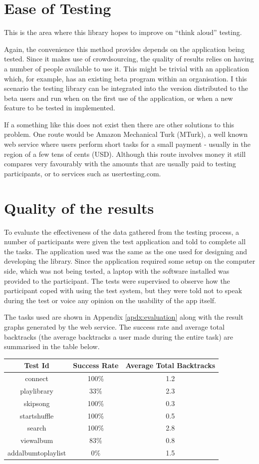 \section{Ease of Testing}

This is the area where this library hopes to improve on ``think
aloud'' testing.

Again, the convenience this method provides depends on the application
being tested. Since it makes use of crowdsourcing, the quality of
results relies on having a number of people available to use it.
This might be trivial with an application which, for example, has
an existing beta program within an organisation. I this scenario
the testing library can be integrated into the version distributed
to the beta users and run when on the first use of the application,
or when a new feature to be tested in implemented.

If a something like this does not exist then there are other solutions
to this problem. One route would be Amazon Mechanical Turk (MTurk),
a well known web service where users perform short tasks for a small
payment - usually in the region of a few tens of cents (USD).
Although this route involves money it still compares very favourably
with the amounts that are usually paid to testing participants, or
to services such as usertesting.com.

\section{Quality of the results}

To evaluate the effectiveness of the data gathered from the testing
process, a number of participants were given the test application
and told to complete all the tasks. The application used was the
same as the one used for designing and developing the library.
Since the application required some setup on the computer side,
which was not being tested, a laptop with the software installed
was provided to the participant. The tests were supervised to observe
how the participant coped with using the test system, but they were told
not to speak during the test or voice any opinion on the usability
of the app itself.

The tasks used are shown in Appendix \ref{apdx:evaluation} along
with the result graphs generated by the web service. The success
rate and average total backtracks (the average backtracks a user
made during the entire task) are summarised in the table below.


\begin{tabular}{| c | c | c |}
\hline
Test Id & Success Rate & Average Total Backtracks \\
\hline
connect & 100\% & 1.2 \\
playlibrary & 33\% & 2.3\\
skipsong & 100\% & 0.3 \\
startshuffle & 100\% & 0.5 \\
search & 100\% & 2.8 \\
viewalbum & 83\% & 0.8 \\
addalbumtoplaylist & 0\% & 1.5 \\
\hline
\end{tabular}

